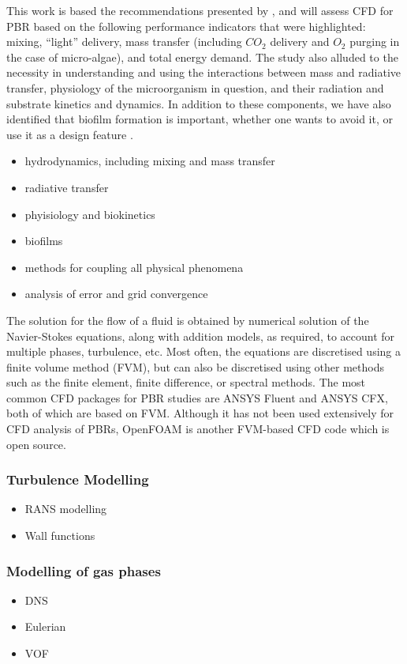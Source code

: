 This work is based the recommendations presented by \cite{Posten2009}, and will assess CFD for PBR based on the following performance indicators that were highlighted: mixing, ``light'' delivery, mass transfer (including $CO_2$ delivery and $O_2$ purging in the case of micro-algae), and total energy demand. The study also alluded to the necessity in understanding and using the interactions between mass and radiative transfer, physiology of the microorganism in question, and their radiation and substrate kinetics and dynamics. In addition to these components, we have also identified that biofilm formation is important, whether one wants to avoid it, or use it as a design feature \cite{Castro2017}.

\begin{itemize}
\item hydrodynamics, including mixing and mass transfer
\item radiative transfer
\item phyisiology and biokinetics
\item biofilms
\item methods for coupling all physical phenomena
\item analysis of error and grid convergence
\end{itemize}

The solution for the flow of a fluid is obtained by numerical solution of the Navier-Stokes equations, along with addition models, as required, to account for multiple phases, turbulence, etc. Most often, the equations are discretised using a finite volume method (FVM), but can also be discretised using other methods such as the finite element, finite difference, or spectral methods.  The most common CFD packages for PBR studies are ANSYS Fluent and ANSYS CFX, both of which are based on FVM.  Although it has not been used extensively for CFD analysis of PBRs, OpenFOAM is another FVM-based CFD code which is open source.


\subsubsection{Turbulence Modelling}

\begin{itemize}
\item RANS modelling
\item Wall functions
\end{itemize}


\subsubsection{Modelling of gas phases}
\begin{itemize}
\item DNS
\item Eulerian
\item VOF
\end{itemize}

